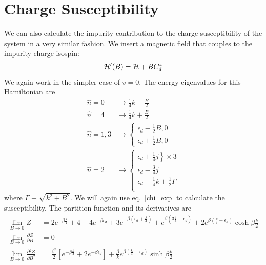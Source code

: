 \documentclass[12pt,twoside]{report}
\numberwithin{equation}{section}
\begin{document}
\section{Charge Susceptibility}
We can also calculate the impurity contribution to the charge susceptibility of the system in a very similar fashion. We insert a magnetic field that couples to the impurity charge isospin:
\begin{equation}\begin{aligned}
	\mathcal{H}^\prime(B) = \mathcal{H} + B C_d^z
\end{aligned}\end{equation}
We again work in the simpler case of \(v=0\). The energy eigenvalues for this Hamiltonian are
\begin{equation}\begin{aligned}
\hat n=0 & \rightarrow\frac{1}{4}k - \frac{B}{2}\\
\hat n=4 &\rightarrow\frac{1}{4}k + \frac{B}{2}\\
\hat n=1,3 &\rightarrow \begin{cases}
	\epsilon_d - \frac{1}{2}B, 0\\ 
	\epsilon_d + \frac{1}{2}B, 0
	\end{cases}\\
	\hat n=2 &\rightarrow \begin{cases}
	\left.\epsilon_d + \frac{1}{4}j \right\}\times 3\\
	\epsilon_d - \frac{3}{4}j \\
	\epsilon_d -\frac{1}{4}k \pm \frac{1}{2} \Gamma \\
\end{cases}
\end{aligned}\end{equation}
where \(\Gamma \equiv \sqrt{k^2 + B^2}\). We will again use eq.~\ref{chi_exp} to calculate the susceptibility. The partition function and its derivatives are
\begin{equation}\begin{aligned}
	\lim_{B \to 0} Z &= 2e^{-\beta \frac{k}{4}} + 4 + 4e^{-\beta \epsilon_d} + 3e^{-\beta\left( \epsilon_d + \frac{j}{4} \right) } + e^{\beta\left( 3\frac{j}{4} - \epsilon_d \right)} + 2e^{\beta \left(\frac{k}{4} - \epsilon_d\right)}\cosh \beta \frac{k}{2}\\
	\lim_{B \to 0} \frac{\partial{Z}}{\partial{B}} &= 0 \\
	\lim_{B \to 0} \frac{\partial{^2Z}}{\partial{B^2}} &= \frac{\beta^2}{2}\left[e^{-\beta \frac{k}{4}} + 2e^{-\beta \epsilon_d}\right] + \frac{\beta}{k}e^{\beta\left(\frac{k}{4} - \epsilon_d\right)}\sinh \beta\frac{k}{2}
\end{aligned}\end{equation}
\end{document}
